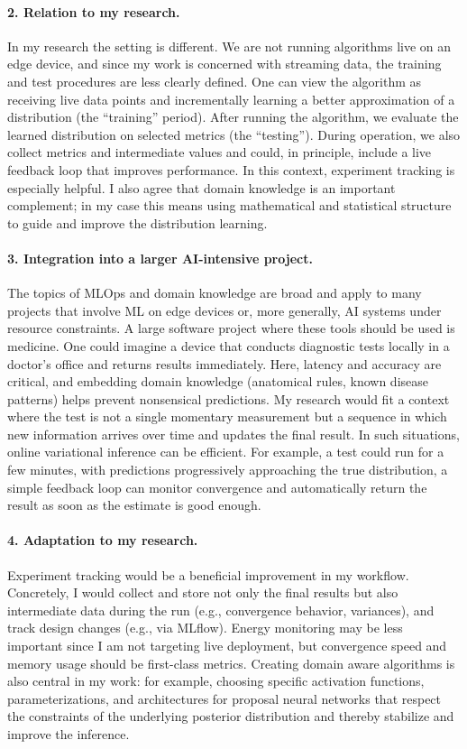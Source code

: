\documentclass[11pt,a4paper]{article}
\begin{document}
\paragraph{2. Relation to my research.}
In my research the setting is different. We are not running algorithms live on an edge device, and since my work is concerned with streaming data, the training and test procedures are less clearly defined. One can view the algorithm as receiving live data points and incrementally learning a better approximation of a distribution (the “training” period). After running the algorithm, we evaluate the learned distribution on selected metrics (the “testing”). During operation, we also collect metrics and intermediate values and could, in principle, include a live feedback loop that improves performance. In this context, experiment tracking is especially helpful. I also agree that domain knowledge is an important complement; in my case this means using mathematical and statistical structure to guide and improve the distribution learning.

\paragraph{3. Integration into a larger AI-intensive project.}
The topics of MLOps and domain knowledge are broad and apply to many projects that involve ML on edge devices or, more generally, AI systems under resource constraints. A large software project where these tools should be used is medicine. One could imagine a device that conducts diagnostic tests locally in a doctor’s office and returns results immediately. Here, latency and accuracy are critical, and embedding domain knowledge (anatomical rules, known disease patterns) helps prevent nonsensical predictions. My research would fit a context where the test is not a single momentary measurement but a sequence in which new information arrives over time and updates the final result. In such situations, online variational inference can be efficient. For example, a test could run for a few minutes, with predictions progressively approaching the true distribution, a simple feedback loop can monitor convergence and automatically return the result as soon as the estimate is good enough.

\paragraph{4. Adaptation to my research.}
Experiment tracking would be a beneficial improvement in my workflow. Concretely, I would collect and store not only the final results but also intermediate data during the run (e.g., convergence behavior, variances), and track design changes (e.g., via MLflow). Energy monitoring may be less important since I am not targeting live deployment, but convergence speed and memory usage should be first-class metrics. Creating domain aware algorithms is also central in my work: for example, choosing specific activation functions, parameterizations, and architectures for proposal neural networks that respect the constraints of the underlying posterior distribution and thereby stabilize and improve the inference.
\end{document}
